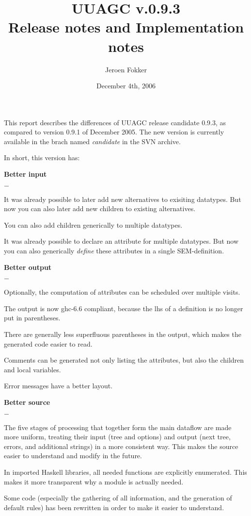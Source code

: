 \documentclass[twoside]{article}
\newenvironment{subitize}{\begin{list}{$-$}{\parsep=0pt\parskip=0pt\topsep=0pt\itemsep=0pt}}{\end{list}}
\begin{document}


\title{UUAGC v.0.9.3\\Release notes and Implementation notes}
\author{Jeroen Fokker}
\date{December 4th, 2006}
\maketitle

This report describes the differences of UUAGC release candidate 0.9.3,
as compared to version 0.9.1 of December 2005.
The new version is currently available in the brach named {\em candidate} in the SVN archive.

In short, this version has:
\begin{itemize}
\item {\bf Better input}
	\begin{subitize}
	\item It was already possible to later add new alternatives to exisiting datatypes.
	      But now you can also later add new children to existing alternatives.
	\item You can also add children generically to multiple datatypes.
	\item It was already possible to declare an attribute for multiple datatypes.
	      But now you can also generically {\em define} these attributes in a single SEM-definition.
	\end{subitize}	      
\item {\bf Better output}
	\begin{subitize}
	\item Optionally, the computation of attributes can be scheduled over multiple visits.
	\item The output is now ghc-6.6 compliant, because the lhs of a definition is no longer put in parentheses.
	\item There are generally less superfluous parentheses in the output,
	      which makes the generated code easier to read.
	\item Comments can be generated not only listing the attributes, but also the children and local variables.
	\item Error messages have a better layout.
	\end{subitize}
\item {\bf Better source}
	\begin{subitize}
	\item The five stages of processing that together form the main dataflow are made more uniform,
	      treating their input (tree and options) and output (next tree, errors, and additional strings)
	      in a more consistent way. This makes the source easier to understand and modify in the future.
	\item In imported Haskell libraries, all needed functions are explicitly enumerated.
	      This makes it more transparent why a module is actually needed.
	\item Some code (especially the gathering of all information, and the generation of default rules)
	      has been rewritten in order to make it easier to understand.
    \end{subitize}
\end{itemize}
\end{document}
